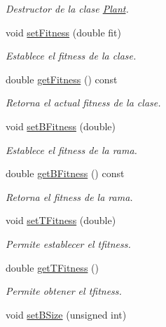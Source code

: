 \begin{DoxyCompactItemize}
\begin{DoxyCompactList}\small\item\em Destructor de la clase \hyperlink{class_plant}{Plant}. \end{DoxyCompactList}\item 
void \hyperlink{class_plant_af60cb9b017dca652f24292707e77eb5b}{set\+Fitness} (double fit)
\begin{DoxyCompactList}\small\item\em Establece el fitness de la clase. \end{DoxyCompactList}\item 
double \hyperlink{class_plant_aff425cc6c39ef2696c41a545b37f6770}{get\+Fitness} () const 
\begin{DoxyCompactList}\small\item\em Retorna el actual fitness de la clase. \end{DoxyCompactList}\item 
\hypertarget{class_plant_a94c7b24824af3a312ee1a5a2ae2e686a}{void \hyperlink{class_plant_a94c7b24824af3a312ee1a5a2ae2e686a}{set\+B\+Fitness} (double)}\label{class_plant_a94c7b24824af3a312ee1a5a2ae2e686a}

\begin{DoxyCompactList}\small\item\em Establece el fitness de la rama. \end{DoxyCompactList}\item 
\hypertarget{class_plant_ab3f3b60326720e4f48a24433ea6be7cf}{double \hyperlink{class_plant_ab3f3b60326720e4f48a24433ea6be7cf}{get\+B\+Fitness} () const }\label{class_plant_ab3f3b60326720e4f48a24433ea6be7cf}

\begin{DoxyCompactList}\small\item\em Retorna el fitness de la rama. \end{DoxyCompactList}\item 
void \hyperlink{class_plant_a9d5f53601636a8fa8fd72ea9a69ad277}{set\+T\+Fitness} (double)
\begin{DoxyCompactList}\small\item\em Permite establecer el tfitness. \end{DoxyCompactList}\item 
double \hyperlink{class_plant_afdbf74edabdfe044d64a3a7c374d6119}{get\+T\+Fitness} ()
\begin{DoxyCompactList}\small\item\em Permite obtener el tfitness. \end{DoxyCompactList}\item 
\hypertarget{class_plant_a06623c3b45a35c2f9a7cb126c1636f0b}{void \hyperlink{class_plant_a06623c3b45a35c2f9a7cb126c1636f0b}{set\+B\+Size} (unsigned int)}\label{class_plant_a06623c3b45a35c2f9a7cb126c1636f0b}


\end{DoxyCompactItemize}
